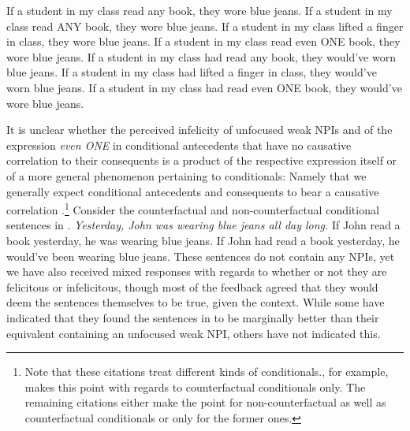 \a{}\ljudge{\%} If a student in my class read any book, they wore blue jeans.
\a{}\ljudge{\#} If a student in my class read \MakeUppercase{any} book, they wore blue jeans.
\a{}\ljudge{\#} If a student in my class lifted a finger in class, they wore blue jeans.
\a{}\ljudge{\#} If a student in my class read even \MakeUppercase{one} book, they wore blue jeans.
\xe
\pex[nopreamble=true]\label{ex:npi-every-bad-analogue4}%
\a{}\ljudge{\%} If a student in my class had read any book, they would've worn blue jeans.
\a{}\ljudge{\#} 
\a{}\ljudge{\#} If a student in my class had lifted a finger in class, they would've worn blue jeans.
\a{}\ljudge{\#} If a student in my class had read even \MakeUppercase{one} book, they would've wore blue jeans.
\xe

It is unclear whether the perceived infelicity of unfocused weak NPIs and of the expression \textit{even \MakeUppercase{one}} in conditional antecedents that have no causative correlation to their consequents is a product of the respective expression itself or of a more general phenomenon pertaining to conditionals: Namely that we generally expect conditional antecedents and consequents to bear a causative correlation \parencite[see, among many others,][]{Douven2008,Schulz2011,Spohn2013,vanRooij2022}.\footnote{Note that these citations treat different kinds of conditionals.\textcite{Schulz2011}, for example, makes this point with regards to counterfactual conditionals only. The remaining citations either make the point for non-counterfactual as well as counterfactual conditionals or only for the former ones.} Consider the counterfactual and non-counterfactual conditional sentences in .
\pex{}\label{ex:bluejeansconditionals}%
\textit{Yesterday, John was wearing blue jeans all day long.}
\a{}\ljudge{\%} If John read a book yesterday, he was wearing blue jeans.
\a{}\ljudge{\%} If John had read a book yesterday, he would've been wearing blue jeans.
\xe
These sentences do not contain any NPIs, yet we have also received mixed responses with regards to whether or not they are felicitous or infelicitous, though most of the feedback agreed that they would deem the sentences themselves to be true, given the context. While some have indicated that they found the sentences in  to be marginally better than their equivalent containing an unfocused weak NPI, others have not indicated this. 

